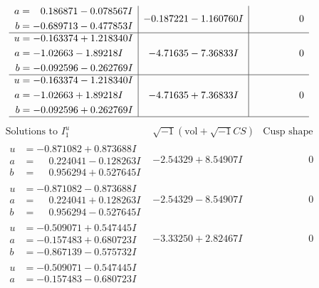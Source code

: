 \documentclass[1p]{elsarticle_modified}
\theoremstyle{definition}
\newcommand{\I}{\sqrt{-1}}
\begin{document}
$$\begin{array}{c|c|c}
\begin{aligned}
a &= \phantom{-}0.186871 - 0.078567 I \\
b &= -0.689713 - 0.477853 I\end{aligned}
 & -0.187221 - 1.160760 I & \phantom{-0.000000 } 0 \\ \hline\begin{aligned}
u &= -0.163374 + 1.218340 I \\
a &= -1.02663 - 1.89218 I \\
b &= -0.092596 - 0.262769 I\end{aligned}
 & -4.71635 - 7.36833 I & \phantom{-0.000000 } 0 \\ \hline\begin{aligned}
u &= -0.163374 - 1.218340 I \\
a &= -1.02663 + 1.89218 I \\
b &= -0.092596 + 0.262769 I\end{aligned}
 & -4.71635 + 7.36833 I & \phantom{-0.000000 } 0\\
 \hline 
 \end{array}$$\newpage$$\begin{array}{c|c|c}  
\text{Solutions to }I^u_{1}& \I (\text{vol} + \sqrt{-1}CS) & \text{Cusp shape}\\
 \hline 
\begin{aligned}
u &= -0.871082 + 0.873688 I \\
a &= \phantom{-}0.224041 - 0.128263 I \\
b &= \phantom{-}0.956294 + 0.527645 I\end{aligned}
 & -2.54329 + 8.54907 I & \phantom{-0.000000 } 0 \\ \hline\begin{aligned}
u &= -0.871082 - 0.873688 I \\
a &= \phantom{-}0.224041 + 0.128263 I \\
b &= \phantom{-}0.956294 - 0.527645 I\end{aligned}
 & -2.54329 - 8.54907 I & \phantom{-0.000000 } 0 \\ \hline\begin{aligned}
u &= -0.509071 + 0.547445 I \\
a &= -0.157483 + 0.680723 I \\
b &= -0.867139 - 0.575732 I\end{aligned}
 & -3.33250 + 2.82467 I & \phantom{-0.000000 } 0 \\ \hline\begin{aligned}
u &= -0.509071 - 0.547445 I \\
a &= -0.157483 - 0.680723 I \\

\end{aligned}
\end{array}$$
\end{document}
